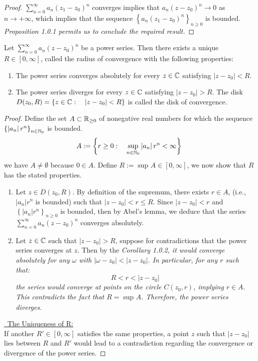 \begin{proof}
$\sum_{n=0}^{\infty} a_n (z_1-z_0) ^n  $ converges implies  that $a_n (z-z_0) ^n  \rightarrow 0 $  
as $n \rightarrow + \infty  $, which implies that the sequence $\left\{ a_n (z_1-z_0) ^n  \right\}_{n \geq 0} $ is bounded.
\it Proposition 1.0.1 \normalfont permits us to conclude the required result.
\end{proof}
\begin{theorem}
  Let $\sum_{n=0}^{\infty} a_n (z-z_0) ^n  $ be a power series. Then there exists a unique $R \in \left[ 0, \infty  \right] $, 
  called the radius of convergence with the following properties: 
  \begin{enumerate}
    \item[\ding{172}]The power series converges absolutely for every $z \in \mathbb{C}  $ satisfying $\left| z-z_0 \right| <  R $.
    \item[\ding{173}] The power series diverges for every $z \in \mathbb{C}  $ satisfying $\left| z-z_0 \right|> R $. 
      The disk $D(z_0, R)  = \left\{ z \in  \mathbb{C} : \quad \left| z-z_0 \right|< R \right\} $ is called
      the disk of convergence.
  \end{enumerate}
\end{theorem}

\begin{proof}
Define the set $A \subset \mathbb{R}_{ \geq 0} $ of nonegative real numbers for which 
the sequence $\left\{ \left| a_n  \right| r^{n} \right\}_{n \in \mathbb{N}_0}$  is bounded.
\[
A := 
\left\{ r \geq 0: \quad \sup_{n \in  \mathbb{N}_0}  \left| a_n  \right|r^{n} < \infty  \right\}
\]
we have $A \neq \emptyset  $ because $ 0 \in  A $. 
Define $R := \sup_{} A \in \left[ 0, \infty  \right]$, we now show that $R $ has the stated
properties.
\begin{enumerate}
  \item[\ding{50}\ding{172}] Let $z \in  D(z_0, R)  $. By definition of the supremum, there exists $r \in  A $, (i.e., 
  $\left| a_n  \right|r^{n} $ is bounded) such that $\left| z-z_0 \right| <  r \leq R$. Since 
  $\left| z-z_0 \right|<  r $  and $\left\{ \left| a_n  \right|r^n  \right\}_{n \geq 0}$ is bounded, 
  then by Abel's lemma, we deduce that the series $\sum_{n=0}^{\infty} a_n (z-z_0) ^n  $ converges 
  absolutely.
\item[\ding{50}\ding{173}]Let $z \in  \mathbb{C}  $ such that $\left| z-z_0 \right| > R $, suppose for contradictions that the power 
   series converges at $z $. Then by the \it Corollary 1.0.2\normalfont, it would converge absolutely for any
   $\omega  $ with $\left|  \omega - z_0 \right|<   \left| z-z_0 \right|$. In particular, for any $r $ such that: 
   \[
   R < r <  \left| z-z_0\right|
   \]
   the series would converge at points on the circle $C(z_0, r)  $, implying $r \in  A$. This contradicts 
   the fact that $R = \sup_{} A $. Therefore, the power series diverges.
\end{enumerate}
\uline{~The Uniqueness of R:} \\
If another $R' \in \left[ 0, \infty  \right] $ satisfies
the same properties, a point $z $ such that $\left| z-z_0 \right| $ lies between $R $ 
and $R' $ would lead to a contradiction regarding the convergence or divergence of the power series.
\end{proof}
